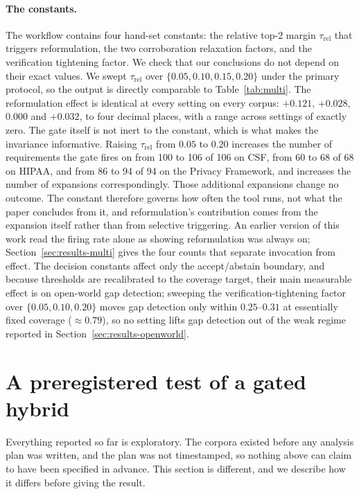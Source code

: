 \documentclass[a4paper,fleqn]{cas-sc}
\begin{document}
\paragraph{The constants.}
The workflow contains four hand-set constants: the relative top-2 margin $\tau_{\text{rel}}$ that triggers reformulation, the two corroboration relaxation factors, and the verification tightening factor.
We check that our conclusions do not depend on their exact values.
We swept $\tau_{\text{rel}}$ over $\{0.05, 0.10, 0.15, 0.20\}$ under the primary protocol, so the output is directly comparable to Table~\ref{tab:multi}. The reformulation effect is identical at every setting on every corpus: $+0.121$, $+0.028$, $0.000$ and $+0.032$, to four decimal places, with a range across settings of exactly zero.
The gate itself is not inert to the constant, which is what makes the invariance informative. Raising $\tau_{\text{rel}}$ from $0.05$ to $0.20$ increases the number of requirements the gate fires on from 100 to 106 of 106 on CSF, from 60 to 68 of 68 on HIPAA, and from 86 to 94 of 94 on the Privacy Framework, and increases the number of expansions correspondingly. Those additional expansions change no outcome. The constant therefore governs how often the tool runs, not what the paper concludes from it, and reformulation's contribution comes from the expansion itself rather than from selective triggering.
An earlier version of this work read the firing rate alone as showing reformulation was always on; Section~\ref{sec:results-multi} gives the four counts that separate invocation from effect.
The decision constants affect only the accept/abstain boundary, and because thresholds are recalibrated to the coverage target, their main measurable effect is on open-world gap detection; sweeping the verification-tightening factor over $\{0.05, 0.10, 0.20\}$ moves gap detection only within $0.25$--$0.31$ at essentially fixed coverage ($\approx 0.79$), so no setting lifts gap detection out of the weak regime reported in Section~\ref{sec:results-openworld}.


\section{A preregistered test of a gated hybrid}
\label{sec:hybrid}

Everything reported so far is exploratory. The corpora existed before any analysis plan was written, and the plan was not timestamped, so nothing above can claim to have been specified in advance. This section is different, and we describe how it differs before giving the result.
\end{document}
